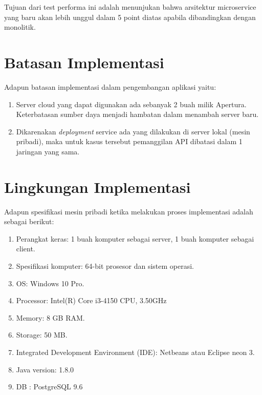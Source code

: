 Tujuan dari test performa ini adalah menunjukan bahwa arsitektur microservice yang baru akan lebih unggul dalam 5 point diatas apabila dibandingkan dengan monolitik.

\section{Batasan Implementasi}
Adapun batasan implementasi dalam pengembangan aplikasi yaitu:

\begin{enumerate}[leftmargin=*]
	\item Server cloud yang dapat digunakan ada sebanyak 2 buah milik Apertura. Keterbatasan sumber daya menjadi hambatan dalam menambah server baru.
	\item Dikarenakan \textit{deployment} service ada yang dilakukan di server lokal (mesin pribadi), maka untuk kasus tersebut pemanggilan API dibatasi dalam 1 jaringan yang sama. 
\end{enumerate}
\section{Lingkungan Implementasi}
Adapun spesifikasi mesin pribadi ketika melakukan proses implementasi adalah sebagai berikut:

\begin{enumerate}[leftmargin=*]
	\item Perangkat keras: 1 buah komputer sebagai server, 1 buah komputer sebagai client.
	\item Spesifikasi komputer: 64-bit prosesor dan sistem operasi.
	\item OS: Windows 10 Pro.
	\item Processor: Intel(R) Core i3-4150 CPU, 3.50GHz
	\item Memory: 8 GB RAM.
	\item Storage: 50 MB.
	\item Integrated Development Environment (IDE): Netbeans atau Eclipse neon 3.
	\item Java version: 1.8.0
	\item DB : PostgreSQL 9.6
\end{enumerate}